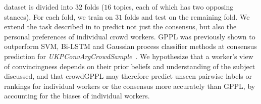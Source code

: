 dataset is divided into $32$ folds ($16$ topics, each of which has two opposing stances). For each fold, we train on $31$ folds and test on the remaining fold.
We extend
the task described in \citet{simpson2018finding} to predict not just the consensus,
but also the personal preferences of individual crowd workers.
GPPL was previously shown to outperform SVM, Bi-LSTM and 
Gaussian process classifier methods at consensus prediction for \emph{UKPConvArgCrowdSample}~\citep{simpson2018finding}. 
We hypothesize that a worker's view of convincingness 
depends on their prior beliefs and understanding of the subject 
discussed, and that crowdGPPL may therefore
predict unseen 
pairwise labels or rankings for individual workers or the consensus more accurately than GPPL,
by accounting 
for the biases of individual workers.

